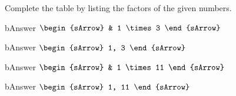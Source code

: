\begin{mtask}[resume]
\task Complete the table by listing the factors of the given numbers.
    \begin{tcbraster}[raster column skip=-0.2pt,
					  colback=white,
					  sharp corners,
					  boxrule=0.3pt,
					  after skip=-0.1pt,
					  raster row skip=-0.1pt,
					  raster height=6cm,
    				  ]
	\begin{tcolorbox}
	    \begin{envCell}{bAnswer}
			 $\begin{sArrow}
                      & 1  \times 3            
				  \end{sArrow}$	
	    \end{envCell}
    \end{tcolorbox}
    \begin{tcolorbox}
	    \begin{envCell}{bAnswer}
			 $\begin{sArrow}
 			          1, 3           
				  \end{sArrow}$	
	    \end{envCell}
    \end{tcolorbox}
	\begin{tcolorbox}
	    \begin{envCell}{bAnswer}
			 $\begin{sArrow}
                      & 1  \times 11            
				  \end{sArrow}$	
	    \end{envCell}
    \end{tcolorbox}
    \begin{tcolorbox}
	    \begin{envCell}{bAnswer}
			 $\begin{sArrow}
 			          1, 11           
				  \end{sArrow}$	
	    \end{envCell}
    \end{tcolorbox}
\end{tcbraster}
\end{mtask}



